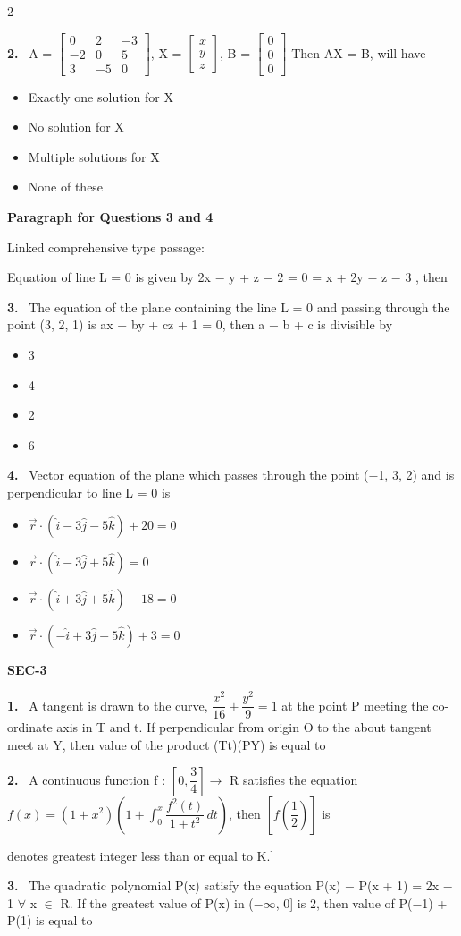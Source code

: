 \documentclass[10pt]{extarticle}
\newcommand{\sect}[1]{\par\smallskip\noindent\textbf{#1}\par}
\newcommand{\qn}[1]{\par\smallskip\noindent\textbf{#1.}~}
\newcommand{\paraq}[2]{\par\smallskip\noindent\textbf{Paragraph for Questions #1 and #2}\par}
\newenvironment{qoptions}{\begin{itemize}[leftmargin=1.8em,itemsep=1pt,topsep=2pt,label={}]}{\end{itemize}}
\newcommand{\opt}[2]{\item[(#1)] #2}
\begin{document}
\begin{multicols}{2}
\qn{2} A = $\begin{bmatrix} 0 & 2 & -3\\ -2 & 0 & 5\\ 3 & -5 & 0 \end{bmatrix}$, X = $\begin{bmatrix} x\\ y\\ z \end{bmatrix}$, B = $\begin{bmatrix} 0\\ 0\\ 0 \end{bmatrix}$ Then AX = B, will have
\begin{qoptions}
\opt{A}{Exactly one solution for X}
\opt{B}{No solution for X}
\opt{C}{Multiple solutions for X}
\opt{D}{None of these}
\end{qoptions}
\paraq{3}{4}Linked comprehensive type passage:\par
Equation of line L = 0 is given by 2x $-$ y + z $-$ 2 = 0 = x + 2y $-$ z $-$ 3 , then\par
\qn{3} The equation of the plane containing the line L = 0 and passing through the point (3, 2, 1) is ax + by + cz + 1 = 0, then a $-$ b + c is divisible by
\begin{qoptions}
\opt{A}{3}
\opt{B}{4}
\opt{C}{2}
\opt{D}{6}
\end{qoptions}
\qn{4} Vector equation of the plane which passes through the point ($-$1, 3, 2) and is perpendicular to line L = 0 is
\begin{qoptions}
\opt{A}{$\vec{r}\cdot(\hat{i} - 3\hat{j} - 5\hat{k}) + 20 = 0$}
\opt{B}{$\vec{r}\cdot(\hat{i} - 3\hat{j} + 5\hat{k}) = 0$}
\opt{C}{$\vec{r}\cdot(\hat{i} + 3\hat{j} + 5\hat{k}) - 18 = 0$}
\opt{D}{$\vec{r}\cdot(-\hat{i} + 3\hat{j} - 5\hat{k}) + 3 = 0$}
\end{qoptions}
\sect{SEC-3}
\qn{1} A tangent is drawn to the curve, $\dfrac{x^2}{16} + \dfrac{y^2}{9} = 1$ at the point P meeting the co-ordinate axis in T and t. If perpendicular from origin O to the about tangent meet at Y, then value of the product (Tt)(PY) is equal to
\qn{2} A continuous function f : $\left[0, \dfrac{3}{4}\right] \to$ R satisfies the equation $f(x) = (1 + x^2)\left(1 + \displaystyle\int_0^x \dfrac{f^2(t)}{1 + t^2}\,dt\right)$, then $\left[f\left(\dfrac{1}{2}\right)\right]$ is\par
[Note : [K] denotes greatest integer less than or equal to K.]
\qn{3} The quadratic polynomial P(x) satisfy the equation P(x) $-$ P(x + 1) = 2x $-$ 1 $\forall$ x $\in$ R. If the greatest value of P(x) in ($-\infty$, 0] is 2, then value of P($-$1) + P(1) is equal to

\end{multicols}
\end{document}
